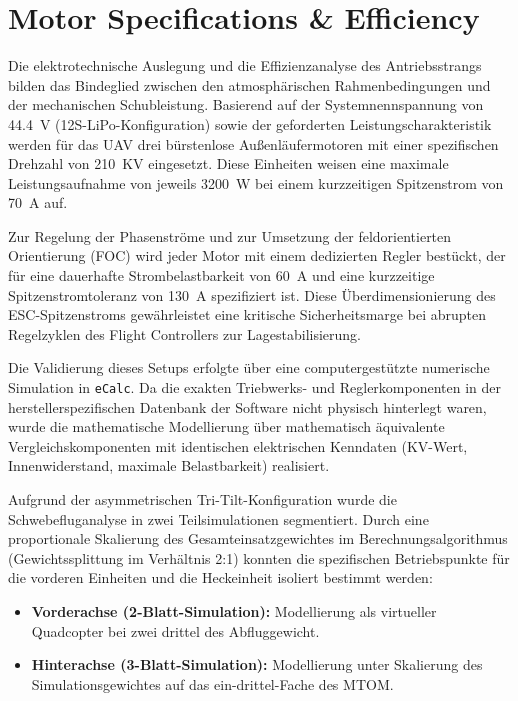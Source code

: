 \section{Motor Specifications \& Efficiency}

\noindent
Die elektrotechnische Auslegung und die Effizienzanalyse des Antriebsstrangs bilden das Bindeglied zwischen den atmosphärischen Rahmenbedingungen und der mechanischen Schubleistung. Basierend auf der Systemnennspannung von \SI{44.4}{\volt} (12S-LiPo-Konfiguration) sowie der geforderten Leistungscharakteristik werden für das UAV drei bürstenlose Außenläufermotoren mit einer spezifischen Drehzahl von \SI{210}{KV} eingesetzt. Diese Einheiten weisen eine maximale Leistungsaufnahme von jeweils \SI{3200}{\watt} bei einem kurzzeitigen Spitzenstrom von \SI{70}{\ampere} auf. 

\noindent
Zur Regelung der Phasenströme und zur Umsetzung der feldorientierten Orientierung (FOC) wird jeder Motor mit einem dedizierten Regler bestückt, der für eine dauerhafte Strombelastbarkeit von \SI{60}{\ampere} und eine kurzzeitige Spitzenstromtoleranz von \SI{130}{\ampere} spezifiziert ist. Diese Überdimensionierung des ESC-Spitzenstroms gewährleistet eine kritische Sicherheitsmarge bei abrupten Regelzyklen des Flight Controllers zur Lagestabilisierung.

\noindent
Die Validierung dieses Setups erfolgte über eine computergestützte numerische Simulation in \texttt{eCalc}. Da die exakten Triebwerks- und Reglerkomponenten in der herstellerspezifischen Datenbank der Software nicht physisch hinterlegt waren, wurde die mathematische Modellierung über mathematisch äquivalente Vergleichskomponenten mit identischen elektrischen Kenndaten (KV-Wert, Innenwiderstand, maximale Belastbarkeit) realisiert. 

\noindent
Aufgrund der asymmetrischen Tri-Tilt-Konfiguration wurde die Schwebefluganalyse in zwei Teilsimulationen segmentiert. Durch eine proportionale Skalierung des Gesamteinsatzgewichtes im Berechnungsalgorithmus (Gewichtssplittung im Verhältnis 2:1) konnten die spezifischen Betriebspunkte für die vorderen Einheiten und die Heckeinheit isoliert bestimmt werden:

\begin{itemize}
    \item \textbf{Vorderachse (2-Blatt-Simulation):} Modellierung als virtueller Quadcopter bei zwei drittel des Abfluggewicht.
    \item \textbf{Hinterachse (3-Blatt-Simulation):} Modellierung unter Skalierung des Simulationsgewichtes auf das ein-drittel-Fache des MTOM.
\end{itemize}


